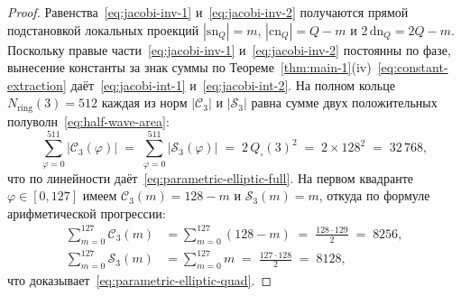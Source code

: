 \documentclass[11pt,a4paper]{article}
\theoremstyle{plain}
\theoremstyle{definition}
\begin{document}
\begin{proof}
Равенства~\eqref{eq:jacobi-inv-1} и~\eqref{eq:jacobi-inv-2} получаются прямой подстановкой локальных проекций $|\mathrm{sn}_Q| = m$, $|\mathrm{cn}_Q| = Q - m$ и $2\,\mathrm{dn}_Q = 2Q - m$. Поскольку правые части~\eqref{eq:jacobi-inv-1} и~\eqref{eq:jacobi-inv-2} постоянны по фазе, вынесение константы за знак суммы по Теореме~\ref{thm:main-1}(iv)~\eqref{eq:constant-extraction} даёт~\eqref{eq:jacobi-int-1} и~\eqref{eq:jacobi-int-2}. На полном кольце $N_{\mathrm{ring}}(3) = 512$ каждая из норм $|\mathcal{C}_3|$ и $|\mathcal{S}_3|$ равна сумме двух положительных полуволн~\eqref{eq:half-wave-area}:
\begin{equation*}
  \sum_{\varphi=0}^{511} |\mathcal{C}_3(\varphi)| \;=\; \sum_{\varphi=0}^{511} |\mathcal{S}_3(\varphi)| \;=\; 2\,Q_\square(3)^2 \;=\; 2\times 128^2 \;=\; 32\,768,
\end{equation*}
что по линейности даёт~\eqref{eq:parametric-elliptic-full}. На первом квадранте $\varphi \in [0, 127]$ имеем $\mathcal{C}_3(m) = 128 - m$ и $\mathcal{S}_3(m) = m$, откуда по формуле арифметической прогрессии:
\begin{align*}
  \sum_{m=0}^{127} \mathcal{C}_3(m) &= \sum_{m=0}^{127} (128 - m) \;=\; \frac{128\cdot 129}{2} \;=\; 8256, \\
  \sum_{m=0}^{127} \mathcal{S}_3(m) &= \sum_{m=0}^{127} m \;=\; \frac{127\cdot 128}{2} \;=\; 8128,
\end{align*}
что доказывает~\eqref{eq:parametric-elliptic-quad}.
\end{proof}
\end{document}
